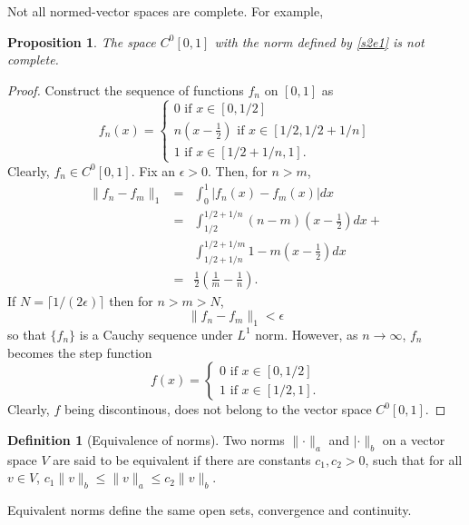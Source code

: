 \documentclass{article}
\theoremstyle{plain}
\numberwithin{thm}{section}
\theoremstyle{plain}
\newtheorem{prop}{Proposition}
\numberwithin{prop}{section}
\theoremstyle{definition}
\newtheorem{defn}{Definition}
\numberwithin{defn}{section}
\theoremstyle{remark}
\numberwithin{equation}{section}
\begin{document}
Not all normed-vector spaces are complete. For example,
\begin{prop}
The space $C^0[0, 1]$ with the norm defined by \eqref{s2e1} is not complete.
\end{prop}
\begin{proof}
Construct the sequence of functions $f_n$ on $[0, 1]$ as
\[
f_n(x) = \begin{cases} 0 \text{ if } x \in [0, 1/2] \\
n\left(x - \frac{1}{2}\right) \text{ if } x \in [1/2, 1/2 + 1/n] \\
1 \text{ if } x \in [1/2 + 1/n, 1].
\end{cases}
\]
Clearly, $f_n \in C^0[0, 1]$. Fix an $\epsilon > 0$. Then, for $n > m$,
\begin{eqnarray*}
\lVert f_n - f_m\rVert_1 &=& \int_0^1|f_n(x) - f_m(x)|dx \\
 &=& \int_{1/2}^{1/2+1/n}(n - m)\left(x - \frac{1}{2}\right)dx + \\
 & &  \int_{1/2 + 1/n}^{1/2 + 1/m} 1 - m\left(x - \frac{1}{2}\right)dx \\
 &=& \frac{1}{2}\left(\frac{1}{m} - \frac{1}{n}\right).
\end{eqnarray*}
If $N = \lceil 1/(2\epsilon)\rceil$ then for $n > m > N$,
\[
\lVert f_n - f_m\rVert_1 < \epsilon
\]
so that $\{f_n\}$ is a Cauchy sequence under $L^1$ norm. However, as $n
\rightarrow \infty$, $f_n$ becomes the step function
\[
f(x) = \begin{cases} 0 \text{ if } x \in [0, 1/2] \\ 1 \text { if } x \in [1/2,
1]. \end{cases}
\]
Clearly, $f$ being discontinous, does not belong to the vector space $C^0[0,1]$.
\end{proof}

\begin{defn}[Equivalence of norms]
Two norms $\lVert\cdot\rVert_a$ and $\lvert\cdot\rVert_b$ on a vector space
$V$ are said to be equivalent if there are constants $c_1, c_2 > 0$, such that
for all $v \in V$, $c_1\lVert v \rVert_b \le \lVert v \rVert_a \le c_2\lVert v
\rVert_b$.
\end{defn}

Equivalent norms define the same open sets, convergence and continuity. 
\end{document}
